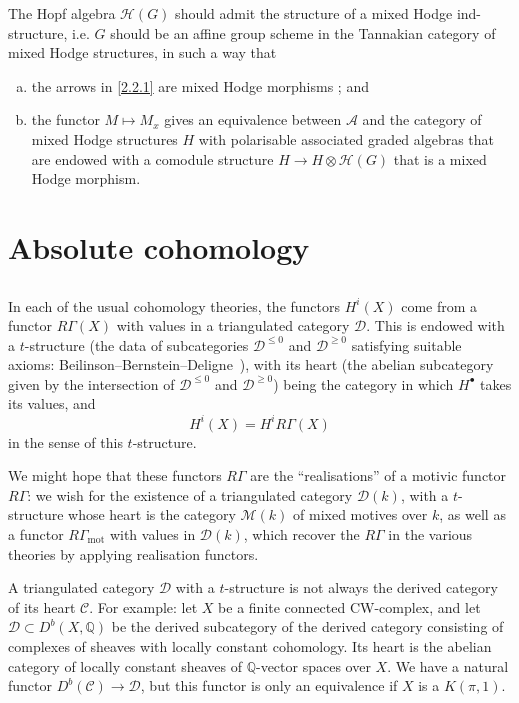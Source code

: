 \documentclass{article}
\theoremstyle{plain}
\theoremstyle{definition}
\newcommand{\sh}[1]{{\mathscr{#1}}}
\newcommand{\QQ}{\mathbb{Q}}
\newcommand{\mot}{\mathrm{mot}}
\renewcommand{\geq}{\geqslant}
\renewcommand{\leq}{\leqslant}
\begin{document}
The Hopf algebra $\sh{H}(G)$ should admit the structure of a mixed Hodge ind-structure, i.e. $G$ should be an affine group scheme in the Tannakian category of mixed Hodge structures, in such a way that
\begin{enumerate}[(a)]
  \item the arrows in \cref{2.2.1} are mixed Hodge morphisms ; and
  \item the functor $M\mapsto M_x$ gives an equivalence between $\sh{A}$ and the category of mixed Hodge structures $H$ with polarisable associated graded algebras that are endowed with a comodule structure $H\to H\otimes\sh{H}(G)$ that is a mixed Hodge morphism.
\end{enumerate}


\section{Absolute cohomology}
\label{3}

\subsection{}
\label{3.1}

In each of the usual cohomology theories, the functors $H^i(X)$ come from a functor $R\Gamma(X)$ with values in a triangulated category $\sh{D}$.
This is endowed with a $t$-structure (the data of subcategories $\sh{D}^{\leq0}$ and $\sh{D}^{\geq0}$ satisfying suitable axioms: Beilinson--Bernstein--Deligne~\cite[1.3]{3}), with its heart (the abelian subcategory given by the intersection of $\sh{D}^{\leq0}$ and $\sh{D}^{\geq0}$) being the category in which $H^\bullet$ takes its values, and
\[
  H^i(X) = H^iR\Gamma(X)
\]
in the sense of this $t$-structure.

We might hope that these functors $R\Gamma$ are the ``realisations'' of a motivic functor $R\Gamma$:
we wish for the existence of a triangulated category $\sh{D}(k)$, with a $t$-structure whose heart is the category $\sh{M}(k)$ of mixed motives over $k$, as well as a functor $R\Gamma_\mot$ with values in $\sh{D}(k)$, which recover the $R\Gamma$ in the various theories by applying realisation functors.

A triangulated category $\sh{D}$ with a $t$-structure is not always the derived category of its heart $\sh{C}$.
For example: let $X$ be a finite connected CW-complex, and let $\sh{D}\subset D^b(X,\QQ)$ be the derived subcategory of the derived category consisting of complexes of sheaves with locally constant cohomology.
Its heart is the abelian category of locally constant sheaves of $\QQ$-vector spaces over $X$.
We have a natural functor $D^b(\sh{C})\to\sh{D}$, but this functor is only an equivalence if $X$ is a $K(\pi,1)$.
\end{document}
